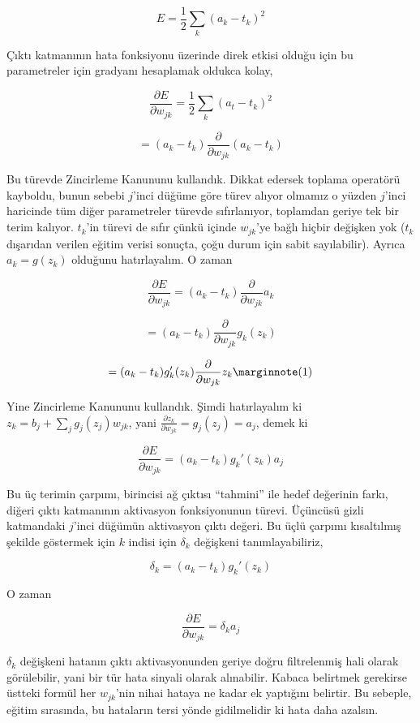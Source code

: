 \documentclass[12pt,fleqn]{article}\usepackage{../../common}
\begin{document}
$$ E = \frac{1}{2}  \sum_k (a_k - t_k)^2$$

Çıktı katmanının hata fonksiyonu üzerinde direk etkisi olduğu için bu
parametreler için gradyanı hesaplamak oldukca kolay, 

$$ \frac{\partial E}{\partial w_{jk}} = \frac{1}{2} \sum_k (a_t - t_k)^2$$

$$ = (a_k-t_k) \frac{\partial }{\partial w_{jk}} (a_k-t_k)$$

Bu türevde Zincirleme Kanununu kullandık. Dikkat edersek toplama operatörü
kayboldu, bunun sebebi $j$'inci düğüme göre türev alıyor olmamız o yüzden
$j$'inci haricinde tüm diğer parametreler türevde sıfırlanıyor, toplamdan
geriye tek bir terim kalıyor. $t_k$'in türevi de sıfır çünkü içinde
$w_{jk}$'ye bağlı hiçbir değişken yok ($t_k$ dışarıdan verilen eğitim
verisi sonuçta, çoğu durum için sabit sayılabilir). Ayrıca $a_k =
g(z_k)$ olduğunu hatırlayalım. O zaman 

$$  
\frac{\partial E}{\partial w_{jk}}  = 
(a_k-t_k)  \frac{\partial}{\partial w_{jk}} a_k 
$$

$$  
= (a_k-t_k)  \frac{\partial}{\partial w_{jk}} g_k(z_k) 
$$

$$  
= (a_k-t_k)g_k'(z_k)\frac{\partial}{\partial w_{jk}} z_k 
\mlabel{1}
$$

Yine Zincirleme Kanununu kullandık. Şimdi hatırlayalım ki
$z_k=b_j+\sum_j g_j(z_j)w_{jk}$, yani
$\frac{\partial z_k}{\partial w_{jk}} = g_j(z_j) = a_j$, demek ki

$$  
\frac{\partial E}{\partial w_{jk}} =  (a_k-t_k)g_k'(z_k) a_j
$$

Bu üç terimin çarpımı, birincisi ağ çıktısı ``tahmini'' ile hedef değerinin
farkı, diğeri çıktı katmanının aktivasyon fonksiyonunun türevi. Üçüncüsü
gizli katmandaki $j$'inci düğümün aktivasyon çıktı değeri. Bu üçlü çarpımı
kısaltılmış şekilde göstermek için $k$ indisi için $\delta_k$ değişkeni
tanımlayabiliriz, 

$$ \delta_k = (a_k-t_k)g_k'(z_k)$$

O zaman 

$$ \frac{\partial E}{\partial w_{jk}} =  \delta_k a_j $$

$\delta_k$ değişkeni hatanın çıktı aktivasyonunden geriye doğru
filtrelenmiş hali olarak görülebilir, yani bir tür hata sinyali olarak
alınabilir. Kabaca belirtmek gerekirse üstteki formül her $w_{jk}$'nin
nihai hataya ne kadar ek yaptığını belirtir. Bu sebeple, eğitim sırasında,
bu hataların tersi yönde gidilmelidir ki hata daha azalsın. 
\end{document}
